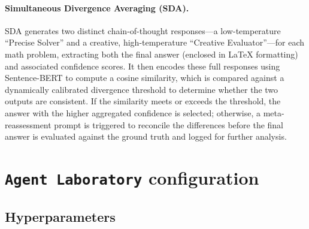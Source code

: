 \documentclass[11pt, a4paper]{include/gdm_format}
\begin{document}
\paragraph{Simultaneous Divergence Averaging (SDA).} SDA generates two distinct chain-of-thought responses—a low-temperature “Precise Solver” and a creative, high-temperature “Creative Evaluator”—for each math problem, extracting both the final answer (enclosed in LaTeX formatting) and associated confidence scores. It then encodes these full responses using Sentence-BERT to compute a cosine similarity, which is compared against a dynamically calibrated divergence threshold to determine whether the two outputs are consistent. If the similarity meets or exceeds the threshold, the answer with the higher aggregated confidence is selected; otherwise, a meta-reassessment prompt is triggered to reconcile the differences before the final answer is evaluated against the ground truth and logged for further analysis.



\section{\texttt{Agent Laboratory} configuration}

\subsection{Hyperparameters}
\end{document}
